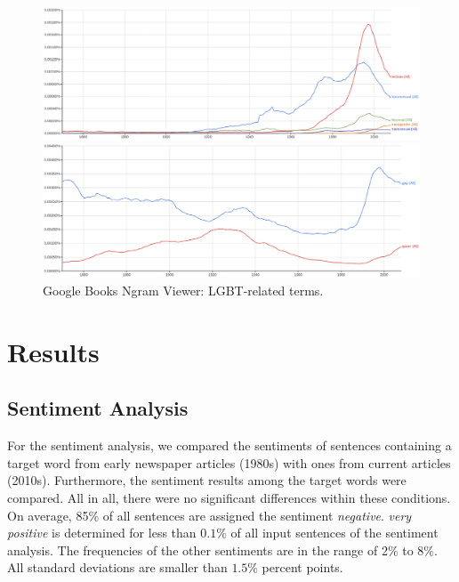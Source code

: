 \documentclass[10pt,a4paper,twocolumn]{scrartcl}
\begin{document}
\begin{figure}
\centering
\includegraphics[width=\textwidth]{figures/google_queryterms}

\vspace*{1cm}

\includegraphics[width=\textwidth]{figures/google_others}
\caption{Google Books Ngram Viewer: LGBT-related terms.} \label{fig:google}
\end{figure}



\section{Results}\label{sec:results}



\subsection{Sentiment Analysis}

For the sentiment analysis, we compared the sentiments of sentences containing a target word from early newspaper articles (1980s) with ones from current articles (2010s). Furthermore, the sentiment results among the target words were compared. All in all, there were no significant differences within these conditions. On average, 85\% of all sentences are assigned the sentiment \textit{negative}. \textit{very positive} is determined for less than $0.1\%$ of all input sentences of the sentiment analysis. The frequencies of the other sentiments are in the range of 2\% to 8\%. All standard deviations are smaller than $1.5\%$ percent points.
\end{document}
